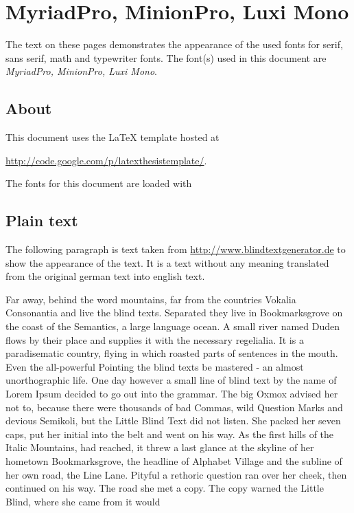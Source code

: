 \documentclass[%
   final,      %
   paper=a4,%
   paper=portrait, %
   pagesize=auto, %
   fontsize=11pt,%
   version=last, %
   english, %
 ]{scrbook} %
\newcommand{\fontcodefile}{fonts/fontcode.tex}
\newcommand{\fontdesc}{}
\renewcommand{\fontdesc}{MyriadPro, MinionPro, Luxi Mono}
\begin{document}
\mainmatter

\chapter{\fontdesc}

The text on these pages demonstrates the appearance of the used fonts for serif, sans serif, math and typewriter fonts. The font(s) used in this document are \textit{\fontdesc}.

\section{About}

This document uses the LaTeX template hosted at
%
\begin{center}
\url{http://code.google.com/p/latexthesistemplate/}.
\end{center}
%
The fonts for this document are loaded with


\section{Plain text}
The following paragraph is text taken from \url{http://www.blindtextgenerator.de} to show the appearance of the text. It is a text without any meaning translated from the original german text into english text.

Far away, behind the word mountains, far from the countries Vokalia Consonantia and live the blind texts. Separated they live in Bookmarksgrove on the coast of the Semantics, a large language ocean. A small river named Duden flows by their place and supplies it with the necessary regelialia. It is a paradisematic country, flying in which roasted parts of sentences in the mouth. Even the all-powerful Pointing the blind texts be mastered - an almost unorthographic life. One day however a small line of blind text by the name of Lorem Ipsum decided to go out into the grammar. The big Oxmox advised her not to, because there were thousands of bad Commas, wild Question Marks and devious Semikoli, but the Little Blind Text did not listen. She packed her seven caps, put her initial into the belt and went on his way. As the first hills of the Italic Mountains, had reached, it threw a last glance at the skyline of her hometown Bookmarksgrove, the headline of Alphabet Village and the subline of her own road, the Line Lane. Pityful a rethoric question ran over her cheek, then continued on his way. The road she met a copy. The copy warned the Little Blind, where she came from it would
\end{document}
